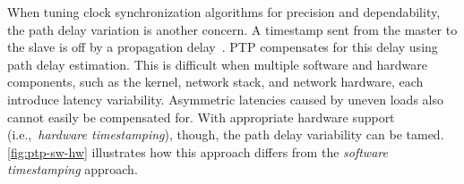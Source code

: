 When tuning clock synchronization algorithms for precision and dependability,
the path delay variation is another concern.
A timestamp sent from the master to the slave is off by a propagation
delay~\cite{managin-pdv-for-ptp}.
PTP compensates for this delay using path delay estimation.
This is difficult when multiple software and hardware components,
such as the kernel, network stack, and network hardware,
each introduce latency variability.
Asymmetric latencies caused by uneven loads also cannot easily be compensated for.
With appropriate hardware support (i.e.,~\textit{hardware timestamping}),
though, the path delay variability can be tamed. %
\cref{fig:ptp-sw-hw} illustrates how this approach differs from
the \textit{software timestamping} approach.


%

